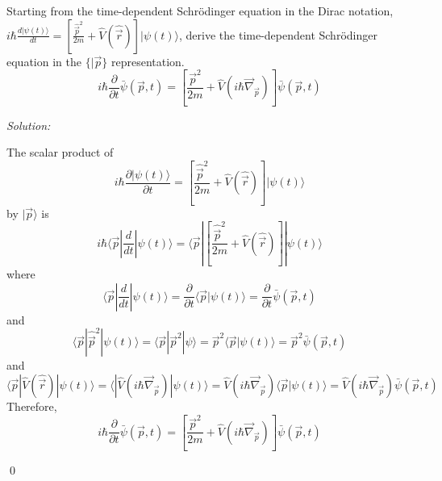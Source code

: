 \documentclass[12pt,a4paper]{article}
\newenvironment{problem}[2][Problem]{\begin{trivlist}
\item[\hskip \labelsep {\bfseries #1}\hskip \labelsep {\bfseries #2.}]}{\end{trivlist}}
\newenvironment{sol}
    {\emph{Solution:}
    }
    {
    \qed
    }
\begin{document}
\begin{problem}{1}
Starting from the time-dependent Schrödinger equation in the Dirac notation, $i\hbar\frac{d|\psi(t)\rangle}{dt}=[\frac{\hat{\vec{p}}^2}{2m}+\hat{V}(\hat{\vec{r}})]|\psi(t)\rangle$, derive the time-dependent Schrödinger equation in the $\{|\vec{p}\}$  representation.
\[
i\hbar\frac{\partial}{\partial t}\bar{\psi}(\vec{p},t)=\left[\frac{\vec{p}^2}{2m}+\hat{V}(i\hbar\vec{\nabla}_{\vec{p}})\right]\bar{\psi}(\vec{p},t)
\]
\end{problem}
\begin{sol}
The scalar product of
\begin{equation}
i\hbar\frac{\partial|\psi(t)\rangle}{\partial t}=\left[\frac{\hat{\vec{p}}^2}{2m}+\hat{V}(\hat{\vec{r}})\right]|\psi(t)\rangle
\end{equation}
by $|\vec{p}\rangle$ is
\begin{equation}
i\hbar\langle\vec{p}|\frac{d}{dt}|\psi(t)\rangle=\langle\vec{p}|\left[\frac{\hat{\vec{p}}^2}{2m}+\hat{V}(\hat{\vec{r}})\right]|\psi(t)\rangle
\end{equation}
where
\begin{equation}
\langle\vec{p}|\frac{d}{dt}|\psi(t)\rangle=\frac{\partial}{\partial t}\langle\vec{p}|\psi(t)\rangle=\frac{\partial}{\partial t}\bar{\psi}(\vec{p},t)
\end{equation}
and
\begin{equation}
\langle\vec{p}|\hat{\vec{p}}^2|\psi(t)\rangle=\langle\vec{p}|\vec{p}^2|\psi\rangle=\vec{p}^2\langle\vec{p}|\psi(t)\rangle=\vec{p}^2\bar{\psi}(\vec{p},t)
\end{equation}
and
\begin{equation}
\langle\vec{p}|\hat{V}(\hat{\vec{r}})|\psi(t)\rangle=\langle|\hat{V}(i\hbar\vec{\nabla}_{\vec{p}})|\psi(t)\rangle=\hat{V}(i\hbar\vec{\nabla}_{\vec{p}})\langle\vec{p}|\psi(t)\rangle=\hat{V}(i\hbar\vec{\nabla}_{\vec{p}})\bar{\psi}(\vec{p},t)
\end{equation}
Therefore,
\begin{equation}
i\hbar\frac{\partial}{\partial t}\bar{\psi}(\vec{p},t)=\left[\frac{\vec{p}^2}{2m}+\hat{V}(i\hbar\vec{\nabla}_{\vec{p}})\right]\bar{\psi}(\vec{p},t)
\end{equation}
\end{sol}
\end{document}
